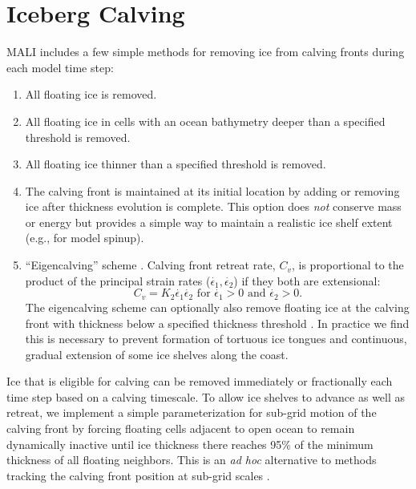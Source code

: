 \section{Iceberg Calving}
\label{sec:calving}
MALI includes a few simple methods for removing ice from calving fronts during each model time step:
\begin{enumerate}
\item All floating ice is removed.
\item All floating ice in cells with an ocean bathymetry deeper than a specified threshold is removed.
\item All floating ice thinner than a specified threshold is removed.
\item The calving front is maintained at its initial location by adding or removing ice after thickness evolution is complete. This option does \textit{not} conserve mass or energy but provides a simple way to maintain a realistic ice shelf extent (e.g., for model spinup).
\item ``Eigencalving'' scheme \citep{Levermann2012}.  Calving front retreat rate, $C_v$, is proportional to the product of the principal strain rates ($\dot{\epsilon_1}, \dot{\epsilon_2}$) if they both are extensional:
\begin{equation}
  C_v = K_2 \dot{\epsilon_1} \dot{\epsilon_2} \text{  for  } \dot{\epsilon_1} > 0 \text{  and  }   \dot{\epsilon_2} > 0.
\label{eigencalving}
\end{equation}
The eigencalving scheme can optionally also remove floating ice at the calving front with thickness below a specified thickness threshold \citep{Feldmann2015}.
In practice we find this is necessary to prevent formation of tortuous ice tongues and continuous, gradual extension of some ice shelves along the coast.
\end{enumerate}
Ice that is eligible for calving can be removed immediately or fractionally each time step
based on a calving timescale. 
To allow ice shelves to advance as well as retreat, we implement a simple parameterization for sub-grid motion of the calving front by forcing floating cells adjacent to open ocean to remain dynamically inactive until ice thickness there reaches 95\% of the minimum thickness of all floating neighbors.
This is an \textit{ad hoc} alternative to methods tracking the calving front position at sub-grid scales \citep{Albrecht2011,Bondzio2016}.
